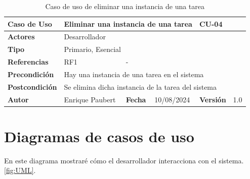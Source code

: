 \begin{table}[!ht]
    \begin{tabular}{|l|l|l|l|l|l|}
	\hline
	\textbf{Caso de Uso} & \multicolumn{3}{l|}{Eliminar una instancia de una tarea} & \multicolumn{2}{l|}{CU-04} \\ \hline
	\textbf{Actores} & \multicolumn{5}{l|}{Desarrollador} \\ \hline
	\textbf{Tipo} & \multicolumn{5}{l|}{Primario, Esencial} \\ \hline
	\textbf{Referencias} & RF1 & \multicolumn{4}{l|}{-} \\ \hline
	\textbf{Precondición} & \multicolumn{5}{l|}{Hay una instancia de una tarea en el sistema} \\ \hline
	\textbf{Postcondición} & \multicolumn{5}{l|}{Se elimina dicha instancia de la tarea del sistema} \\ \hline
	\textbf{Autor} & Enrique Paubert & \textbf{Fecha} & 10/08/2024 & \textbf{Versión} & 1.0 \\ \hline
    \end{tabular}%
    \caption{Caso de uso de eliminar una instancia de una tarea}
    \label{CU-04}
\end{table}

\section{Diagramas de casos de uso}
En este diagrama mostraré cómo el desarrollador interacciona con el sistema. \autoref{fig:UML}.

